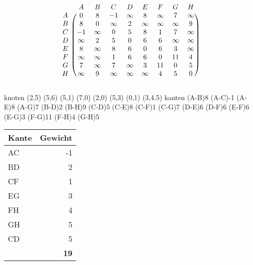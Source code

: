 \documentclass{lehramt-informatik}
\begin{document}
\[
\begin{blockarray}{ccccccccc}
  & A      & B      & C      & D      & E      & F      & G      & H      \\
\begin{block}{c(cccccccc)}
A & 0      & 8      & -1     & \infty & 8      & \infty & 7      & \infty \\
B & 8      & 0      & \infty & 2      & \infty & \infty & \infty & 9      \\
C & -1     & \infty & 0      & 5      & 8      & 1      & 7      & \infty \\
D & \infty & 2      & 5      & 0      & 6      & 6      & \infty & \infty \\
E & 8      & \infty & 8      & 6      & 0      & 6      & 3      & \infty \\
F & \infty & \infty & 1      & 6      & 6      & 0      & 11     & 4      \\
G & 7      & \infty & 7      & \infty & 3      & 11     & 0      & 5      \\
H & \infty & 9      & \infty & \infty & \infty & 4      & 5      & 0      \\
\end{block}
\end{blockarray}
\]



\begin{minipage}{8cm}
\graph knoten {
  (2,5)
  (5,6)
  (5,1)
  (7,0)
  (2,0)
  (5,3)
  (0,1)
  (3,4.5)
} kanten {
  \kante(A-B){8}
  \KANTE(A-C){-1}
  \kante(A-E){8}
  \kante(A-G){7}
  \KANTE(B-D){2}
  \kante(B-H){9}
  \KANTE(C-D){5}
  \kante(C-E){8}
  \KANTE(C-F){1}
  \kante(C-G){7}
  \kante(D-E){6}
  \kante(D-F){6}
  \kante(E-F){6}
  \KANTE(E-G){3}
  \kante(F-G){11}
  \KANTE(F-H){4}
  \KANTE(G-H){5}
}
\end{minipage}
\begin{minipage}{4cm}
\begin{tabular}{lr}
Kante & Gewicht \\
\hline
AC & -1 \\
BD & 2 \\
CF & 1 \\
EG & 3 \\
FH & 4 \\
GH & 5 \\
CD & 5 \\\hline
& \textbf{19} \\
\end{tabular}
\end{minipage}
\end{document}
